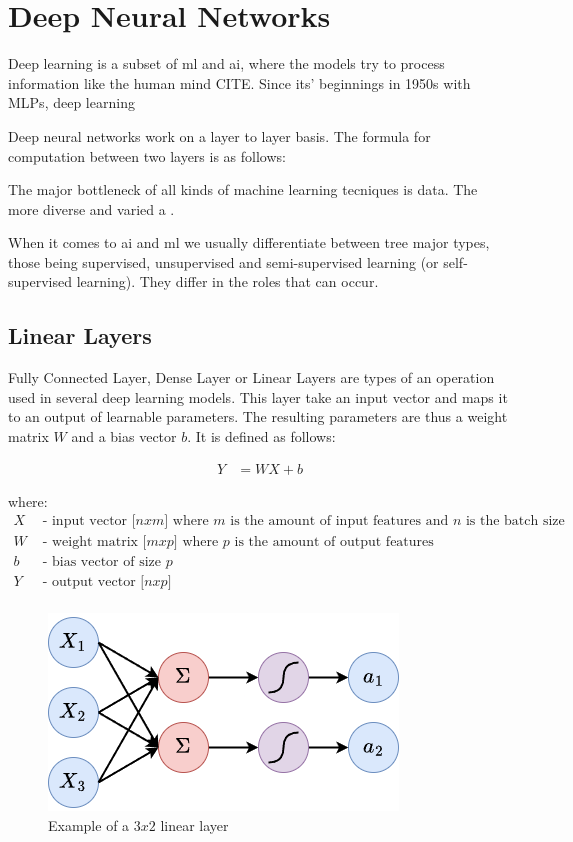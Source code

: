 \section{Deep Neural Networks}

Deep learning is a subset of ml and ai, where the models try to process information like the human mind CITE. Since its' beginnings in 1950s with MLPs, deep learning

Deep neural networks work on a layer to layer basis. The formula for computation between two layers is as follows:



The major bottleneck of all kinds of machine learning tecniques is data. The more diverse and varied a .

When it comes to \acrshort{ai} and \acrshort{ml} we usually differentiate between tree major types, those being supervised, unsupervised and semi-supervised learning (or self-supervised learning). They differ in the roles that can occur.


\subsection{Linear Layers}
\label{back:linear}

Fully Connected Layer, Dense Layer or Linear Layers  are types of an operation used in several deep learning models. This layer take an input vector and maps it to an output of learnable parameters. The resulting parameters are thus a weight matrix $W$ and a bias vector $b$. It is defined as follows:

\begin{align}
    Y &= WX + b
\end{align}

where:
\begin{align*}
    X & \text{ - input vector [$n x m$] where $m$ is the amount of input features and $n$ is the batch size} \\
    W & \text{ - weight matrix [$m x p$] where $p$ is the amount of output features} \\
    b & \text{ - bias vector of size $p$} \\
    Y & \text{ - output vector [$n x p$]} \\
\end{align*}

\begin{figure}[h]
    \centering
    \includegraphics[width=0.5\linewidth]{figures/linearlayer.png}
    \caption{Example of a $3x2$ linear layer}
    \label{fig:linearlayer}
\end{figure}

